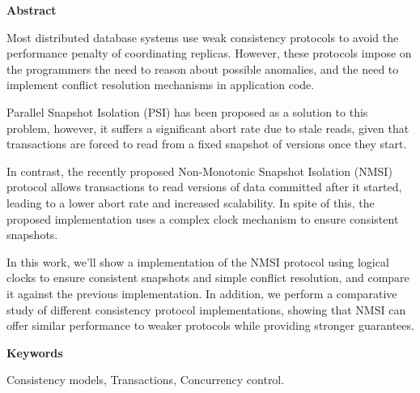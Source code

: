 \newpage

\begin{center}
{\bf \Huge Abstract}
\end{center}

\vspace{1cm}

Most distributed database systems use weak consistency protocols to avoid the
performance penalty of coordinating replicas. However, these protocols impose
on the programmers the need to reason about possible anomalies, and the need
to implement conflict resolution mechanisms in application code.

Parallel Snapshot Isolation (PSI) has been proposed as a solution to this
problem, however, it suffers a significant abort rate due to stale reads,
given that transactions are forced to read from a fixed snapshot of versions
once they start.

In contrast, the recently proposed Non-Monotonic Snapshot Isolation (NMSI)
protocol allows transactions to read versions of data committed after it
started, leading to a lower abort rate and increased scalability. In spite
of this, the proposed implementation uses a complex clock mechanism to ensure
consistent snapshots.

In this work, we'll show a implementation of the NMSI protocol using logical
clocks to ensure consistent snapshots and simple conflict resolution, and
compare it against the previous implementation. In addition, we perform a
comparative study of different consistency protocol implementations, showing
that NMSI can offer similar performance to weaker protocols while providing
stronger guarantees.

\vspace{1cm}

\begin{center}
{\bf \Large Keywords}
\end{center}

\vspace{0.5cm}

Consistency models, Transactions, Concurrency control.
